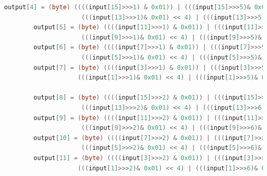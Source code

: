 \documentclass[12pt]{article} %
\begin{document}
\begin{lstlisting}[language=Java, basicstyle=\small, breaklines=true]
        output[4] = (byte) ((((input[15]>>>1) & 0x01)) | (((input[15]>>>5)& 0x01) << 1) | (((input[14]>>>1)& 0x01) << 2) | (((input[14]>>>5)& 0x01) << 3) | 
                     (((input[13]>>>1)& 0x01) << 4) | (((input[13]>>>5)& 0x01) << 5) | (((input[12]>>>1)& 0x01) << 6) | (((input[12]>>>5)& 0x01) << 7));
        output[5] = (byte) ((((input[11]>>>1) & 0x01)) | (((input[11]>>>5)& 0x01) << 1) | (((input[10]>>>1)& 0x01) << 2) | (((input[10]>>>5)& 0x01) << 3) | 
                     (((input[9]>>>1)& 0x01) << 4) | (((input[9]>>>5)& 0x01) << 5) | (((input[8]>>>1)& 0x01) << 6) | (((input[8]>>>5)& 0x01) << 7));
        output[6] = (byte) ((((input[7]>>>1) & 0x01)) | (((input[7]>>>5)& 0x01) << 1) | (((input[6]>>>1)& 0x01) << 2) | (((input[6]>>>5)& 0x01) << 3) | 
                     (((input[5]>>>1)& 0x01) << 4) | (((input[5]>>>5)& 0x01) << 5) | (((input[4]>>>1)& 0x01) << 6) | (((input[4]>>>5)& 0x01) << 7));
        output[7] = (byte) ((((input[3]>>>1) & 0x01)) | (((input[3]>>>5)& 0x01) << 1) | (((input[2]>>>1)& 0x01) << 2) | (((input[2]>>>5)& 0x01) << 3) | 
                    (((input[1]>>>1)& 0x01) << 4) | (((input[1]>>>5)& 0x01) << 5) | (((input[0]>>>1)& 0x01) << 6) | (((input[0]>>>5)& 0x01) << 7));

        output[8] = (byte) ((((input[15]>>>2) & 0x01)) | (((input[15]>>>6)& 0x01) << 1) | (((input[14]>>>2)& 0x01) << 2) | (((input[14]>>>6)& 0x01) << 3) | 
                     (((input[13]>>>2)& 0x01) << 4) | (((input[13]>>>6)& 0x01) << 5) | (((input[12]>>>2)& 0x01) << 6) | (((input[12]>>>6)& 0x01) << 7));
        output[9] = (byte) ((((input[11]>>>2) & 0x01)) | (((input[11]>>>6)& 0x01) << 1) | (((input[10]>>>2)& 0x01) << 2) | (((input[10]>>>6)& 0x01) << 3) | 
                     (((input[9]>>>2)& 0x01) << 4) | (((input[9]>>>6)& 0x01) << 5) | (((input[8]>>>2)& 0x01) << 6) | (((input[8]>>>6)& 0x01) << 7));
        output[10] = (byte) ((((input[7]>>>2) & 0x01)) | (((input[7]>>>6)& 0x01) << 1) | (((input[6]>>>2)& 0x01) << 2) | (((input[6]>>>6)& 0x01) << 3) | 
                     (((input[5]>>>2)& 0x01) << 4) | (((input[5]>>>6)& 0x01) << 5) | (((input[4]>>>2)& 0x01) << 6) | (((input[4]>>>6)& 0x01) << 7));
        output[11] = (byte) ((((input[3]>>>2) & 0x01)) | (((input[3]>>>6)& 0x01) << 1) | (((input[2]>>>2)& 0x01) << 2) | (((input[2]>>>6)& 0x01) << 3) | 
                    (((input[1]>>>2)& 0x01) << 4) | (((input[1]>>>6)& 0x01) << 5) | (((input[0]>>>2)& 0x01) << 6) | (((input[0]>>>6)& 0x01) << 7));


\end{lstlisting}
\end{document}
